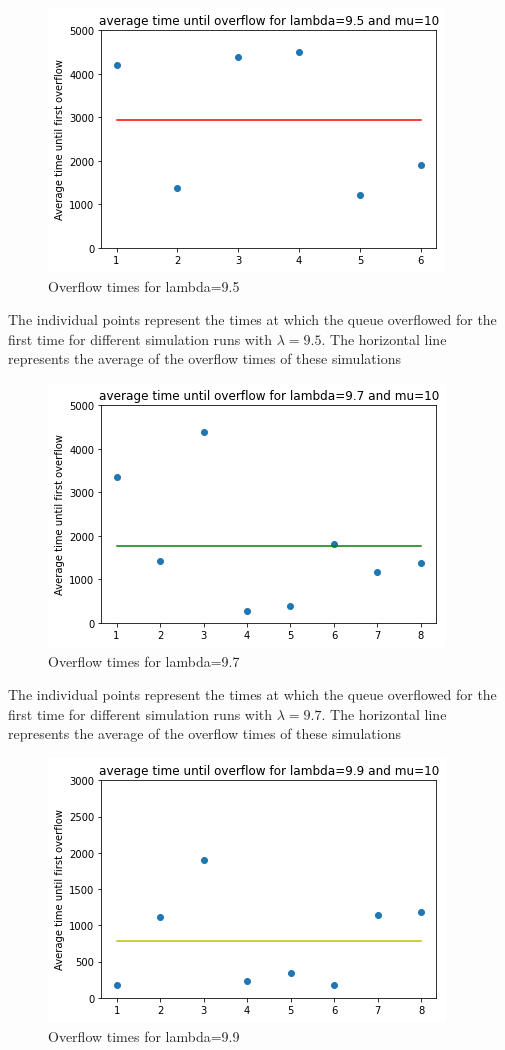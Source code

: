 \begin{figure}[H]
    \centering
    \includegraphics{95.png}
    \caption{Overflow times for lambda=9.5}
    \label{fig:95}
\end{figure}
The individual points represent the times at which the queue overflowed for the first time for different simulation runs with $\lambda=9.5$.
The horizontal line represents the average of the overflow times of these simulations
\begin{figure}[H]
    \centering
    \includegraphics{97.png}
    \caption{Overflow times for lambda=9.7}
    \label{fig:97}
\end{figure}
The individual points represent the times at which the queue overflowed for the first time for different simulation runs with $\lambda=9.7$.
The horizontal line represents the average of the overflow times of these simulations
\begin{figure}[H]
    \centering
    \includegraphics{99.png}
    \caption{Overflow times for lambda=9.9}
    \label{fig:99}
\end{figure}

